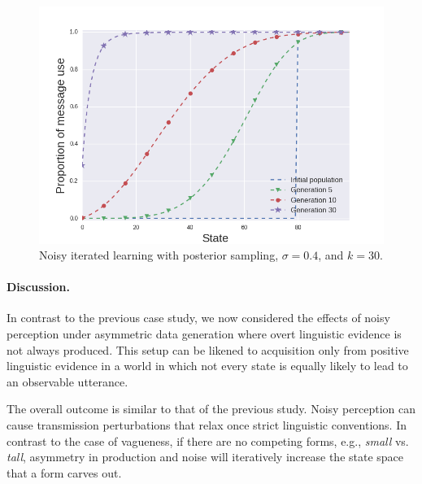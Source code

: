 \documentclass[10pt,a4paper]{article}
\begin{document}
\begin{figure}[ht]
\centering
    \includegraphics[scale=0.4]{../code/plots/deflation-sigma04.png}
  \caption{Noisy iterated learning with posterior sampling, $\sigma = 0.4$, and $k = 30$.}
  \label{fig:defl}
\end{figure}

\paragraph{Discussion.} In contrast to the previous case study, we now considered the effects
of noisy perception under asymmetric data generation where overt linguistic evidence is not
always produced. This setup can be likened to acquisition only from positive linguistic
evidence in a world in which not every state is equally likely to lead to an observable
utterance. %

The overall outcome is similar to that of the previous study. Noisy perception can cause
transmission perturbations that relax once strict linguistic conventions. In contrast to the
case of vagueness, if there are no competing forms, e.g., {\em small} vs. {\em tall}, asymmetry
in production and noise will iteratively increase the state space that a form carves out.
\end{document}
